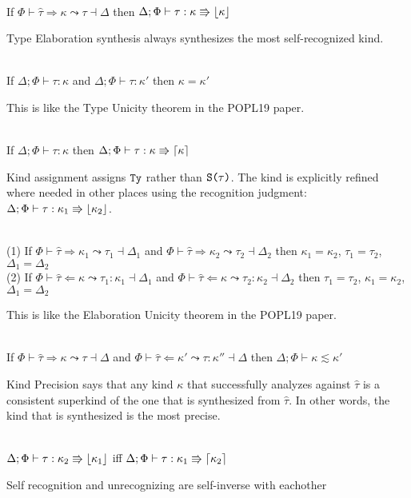 \documentclass[12pt,letterpaper]{article}
\newcommand{\elabAna}[6]{#1 \vdash #2 \Leftarrow #3 \leadsto #4 : #5 \dashv #6}
\newcommand{\elabSyn}[5]{#1 \vdash #2 \Rightarrow #3 \leadsto #4 \dashv #5}
\newcommand{\kconsubkind}[3]{#1 \vdash #2 \lesssim #3}
\newcommand{\kindAssign}[3]{#1 \vdash #2 : #3}
\newcommand{\tauSelfRecognized}[4]{#1 \vdash #2 : #3 \Rrightarrow \floor{#4}}
\newcommand{\tauUnrecognize}[4]{#1 \vdash #2 : #3 \Rrightarrow \ceil{#4}}
\newcommand{\hPhi}{\Phi}
\newcommand{\htau}{\hat{\tau}}
\newcommand{\hkappa}{\kappa}
\newcommand{\dtau}{\tau}
\newcommand{\Ty}{\textt{Ty}}
\newcommand{\KSing}[1]{\textt{S(}#1{\textt{)}}}
\begin{document}
\begin{thm}\ \\
	If $\elabSyn{\hPhi}{\htau}{\hkappa}{\dtau}{\Delta}$ then $\tauSelfRecognized{\Delta;\hPhi}{\dtau}{\hkappa}{\hkappa}$
\end{thm}
\noindent
Type Elaboration synthesis always synthesizes the most self-recognized kind.

\begin{thm}\ \\
	If $\kindAssign{\Delta;\hPhi}{\dtau}{\hkappa}$ and $\kindAssign{\Delta;\hPhi}{\dtau}{\hkappa'}$ then $\hkappa = \hkappa'$
\end{thm}
\noindent
This is like the Type Unicity theorem in the POPL19 paper.

\begin{thm}\ \\
	If $\kindAssign{\Delta;\hPhi}{\dtau}{\hkappa}$ then $\tauUnrecognize{\Delta;\hPhi}{\dtau}{\hkappa}{\hkappa}$
\end{thm}
\noindent
Kind assignment assigns $\Ty$ rather than $\KSing{\dtau}$. The kind is explicitly refined where needed in other places using the recognition judgment: $\tauSelfRecognized{\Delta;\hPhi}{\dtau}{\hkappa_1}{\hkappa_2}$.


\begin{thm}\ \\
	(1) If $\elabSyn{\hPhi}{\htau}{\hkappa_1}{\dtau_1}{\Delta_1}$ and $\elabSyn{\hPhi}{\htau}{\hkappa_2}{\dtau_2}{\Delta_2}$ then $\hkappa_1 = \hkappa_2$, $\dtau_1 = \dtau_2$, $\Delta_1 = \Delta_2$ \\
	(2) If $\elabAna{\hPhi}{\htau}{\hkappa}{\dtau_1}{\hkappa_1}{\Delta_1}$ and $\elabAna{\hPhi}{\htau}{\hkappa}{\dtau_2}{\hkappa_2}{\Delta_2}$ then $\dtau_1 = \dtau_2$, $\hkappa_1 = \hkappa_2$, $\Delta_1 = \Delta_2$
\end{thm}
\noindent
This is like the Elaboration Unicity theorem in the POPL19 paper.



\begin{thm}\ \\
	If $\elabSyn{\hPhi}{\htau}{\hkappa}{\dtau}{\Delta}$ and $\elabAna{\hPhi}{\htau}{\hkappa'}{\dtau}{\hkappa''}{\Delta}$ then $\kconsubkind{\Delta;\hPhi}{\hkappa}{\hkappa'}$
\end{thm}

\noindent
Kind Precision says that any kind $\hkappa$ that successfully analyzes against $\htau$ is a consistent superkind of the one that is synthesized from $\htau$. In other words, the kind that is synthesized is the most precise.


\begin{thm}\ \\
	$\tauSelfRecognized{\Delta;\hPhi}{\dtau}{\hkappa_2}{\hkappa_1}$ iff $\tauUnrecognize{\Delta;\hPhi}{\dtau}{\hkappa_1}{\hkappa_2}$
\end{thm}

\noindent
Self recognition and unrecognizing are self-inverse with eachother
\end{document}

